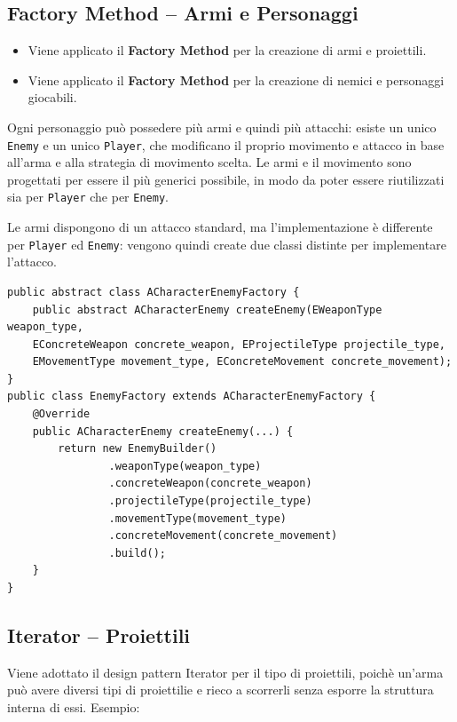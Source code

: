 \documentclass[12pt,a4paper]{article}
\begin{document}
\begin{small}
\subsection{Factory Method – Armi e Personaggi}

\begin{itemize}
  \item Viene applicato il \textbf{Factory Method} per la
    creazione di armi e proiettili.
  \item Viene applicato il \textbf{Factory Method} per la
    creazione di nemici e personaggi giocabili.
\end{itemize}

Ogni personaggio può possedere più armi e quindi più attacchi: esiste un unico \texttt{Enemy} e
un unico \texttt{Player}, che modificano il proprio movimento e attacco in base all'arma e alla
strategia di movimento scelta. Le armi e il movimento sono progettati per essere il più generici
possibile, in modo da poter essere riutilizzati sia per \texttt{Player} che per \texttt{Enemy}.

Le armi dispongono di un attacco standard, ma l'implementazione è differente per \texttt{Player}
ed \texttt{Enemy}: vengono quindi create due classi distinte per implementare l'attacco. 


\begin{verbatim}
public abstract class ACharacterEnemyFactory {
    public abstract ACharacterEnemy createEnemy(EWeaponType weapon_type, 
    EConcreteWeapon concrete_weapon, EProjectileType projectile_type, 
    EMovementType movement_type, EConcreteMovement concrete_movement);
}
public class EnemyFactory extends ACharacterEnemyFactory {
    @Override
    public ACharacterEnemy createEnemy(...) {
        return new EnemyBuilder()
                .weaponType(weapon_type)
                .concreteWeapon(concrete_weapon)
                .projectileType(projectile_type)
                .movementType(movement_type)
                .concreteMovement(concrete_movement)
                .build();
    }
}
\end{verbatim}

\subsection{Iterator – Proiettili}
Viene adottato il design pattern Iterator per il tipo di proiettili, poichè un'arma può avere diversi tipi di proiettilie e rieco a scorrerli senza esporre la struttura interna di essi. Esempio:


\end{small}
\end{document}
